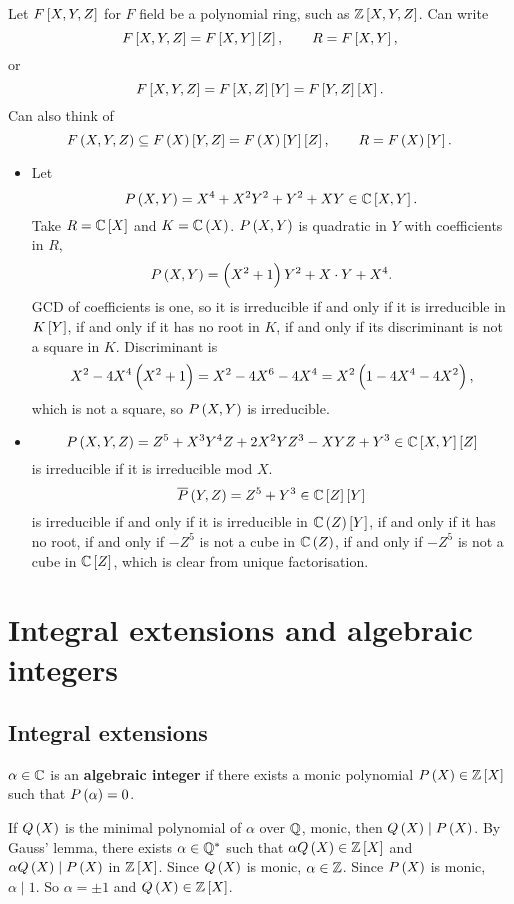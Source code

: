 \begin{example*}
Let $ F\sbr{X, Y, Z} $ for $ F $ field be a polynomial ring, such as $ \Z\sbr{X, Y, Z} $. Can write
$$ F\sbr{X, Y, Z} = F\sbr{X, Y}\sbr{Z}, \qquad R = F\sbr{X, Y}, $$
or
$$ F\sbr{X, Y, Z} = F\sbr{X, Z}\sbr{Y} = F\sbr{Y, Z}\sbr{X}. $$
Can also think of
$$ F\br{X, Y, Z} \subseteq F\br{X}\sbr{Y, Z} = F\br{X}\sbr{Y}\sbr{Z}, \qquad R = F\br{X}\sbr{Y}. $$
\begin{itemize}
\item Let
$$ P\br{X, Y} = X^4 + X^2Y^2 + Y^2 + XY \in \C\sbr{X, Y}. $$
Take $ R = \C\sbr{X} $ and $ K = \C\br{X} $. $ P\br{X, Y} $ is quadratic in $ Y $ with coefficients in $ R $,
$$ P\br{X, Y} = \br{X^2 + 1}Y^2 + X \cdot Y + X^4. $$
GCD of coefficients is one, so it is irreducible if and only if it is irreducible in $ K\sbr{Y} $, if and only if it has no root in $ K $, if and only if its discriminant is not a square in $ K $. Discriminant is
$$ X^2 - 4X^4\br{X^2 + 1} = X^2 - 4X^6 - 4X^4 = X^2\br{1 - 4X^4 - 4X^2}, $$
which is not a square, so $ P\br{X, Y} $ is irreducible.
\item
$$ P\br{X, Y, Z} = Z^5 + X^3Y^4Z + 2X^2YZ^3 - XYZ + Y^3 \in \C\sbr{X, Y}\sbr{Z} $$
is irreducible if it is irreducible mod $ X $.
$$ \overline{P}\br{Y, Z} = Z^5 + Y^3 \in \C\sbr{Z}\sbr{Y} $$
is irreducible if and only if it is irreducible in $ \C\br{Z}\sbr{Y} $, if and only if it has no root, if and only if $ -Z^5 $ is not a cube in $ \C\br{Z} $, if and only if $ -Z^5 $ is not a cube in $ \C\sbr{Z} $, which is clear from unique factorisation.
\end{itemize}
\end{example*}

\pagebreak

\section{Integral extensions and algebraic integers}

\subsection{Integral extensions}

\begin{definition}
$ \alpha \in \mathbb{C} $ is an \textbf{algebraic integer} if there exists a monic polynomial $ P\br{X} \in \Z\sbr{X} $ such that $ P\br{\alpha} = 0 $.
\end{definition}

\begin{note*}
If $ Q\br{X} $ is the minimal polynomial of $ \alpha $ over $ \mathbb{Q} $, monic, then $ Q\br{X} \mid P\br{X} $. By Gauss' lemma, there exists $ \alpha \in \mathbb{Q}^* $ such that $ \alpha Q\br{X} \in \Z\sbr{X} $ and $ \alpha Q\br{X} \mid P\br{X} $ in $ \Z\sbr{X} $. Since $ Q\br{X} $ is monic, $ \alpha \in \mathbb{Z} $. Since $ P\br{X} $ is monic, $ \alpha \mid 1 $. So $ \alpha = \pm 1 $ and $ Q\br{X} \in \Z\sbr{X} $.
\end{note*}

